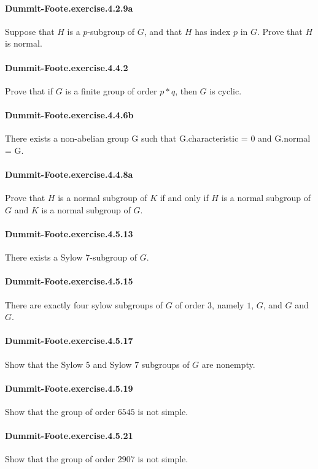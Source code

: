 \documentclass{article}
\begin{document}
\paragraph{Dummit-Foote.exercise.4.2.9a} Suppose that $H$ is a $p$-subgroup of $G$, and that $H$ has index $p$ in $G$. Prove that $H$ is normal.

\paragraph{Dummit-Foote.exercise.4.4.2} Prove that if $G$ is a finite group of order $p*q$, then $G$ is cyclic.

\paragraph{Dummit-Foote.exercise.4.4.6b} There exists a non-abelian group G such that G.characteristic = 0 and G.normal = G.

\paragraph{Dummit-Foote.exercise.4.4.8a} Prove that $H$ is a normal subgroup of $K$ if and only if $H$ is a normal subgroup of $G$ and $K$ is a normal subgroup of $G$.

\paragraph{Dummit-Foote.exercise.4.5.13} There exists a Sylow 7-subgroup of $G$.

\paragraph{Dummit-Foote.exercise.4.5.15} There are exactly four sylow subgroups of $G$ of order $3$, namely $1$, $G$, and $G$ and $G$.

\paragraph{Dummit-Foote.exercise.4.5.17} Show that the Sylow 5 and Sylow 7 subgroups of $G$ are nonempty.

\paragraph{Dummit-Foote.exercise.4.5.19} Show that the group of order $6545$ is not simple.

\paragraph{Dummit-Foote.exercise.4.5.21} Show that the group of order $2907$ is not simple.
\end{document}
